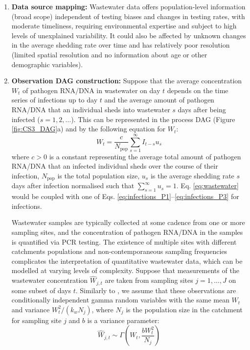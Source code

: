 \documentclass{article}
\begin{document}
\begin{enumerate}
\begin{enumerate}
    \item \textbf{Data source mapping:} Wastewater data offers population-level information (broad scope) independent of testing biases and changes in testing rates, with moderate timeliness, requiring environmental expertise and subject to high levels of unexplained variability. It could also be affected by unknown changes in the average shedding rate over time and has relatively poor resolution (limited spatial resolution and no information about age or other demographic variables). 

    
    \item \textbf{Observation DAG construction:} 
    Suppose that the average concentration $W_t$ of pathogen RNA/DNA in wastewater on day $t$ depends on the time series of infections up to day $t$ and the average amount of pathogen RNA/DNA that an individual sheds into wastewater $s$ days after being infected ($s=1,2,\ldots$). This can be represented in the process DAG (Figure \ref{fig:CS3_DAG}a) and by the following equation for $W_t$:
    \begin{equation} \label{eq:wastewater}
        W_t = \frac{c}{N_\mathrm{pop}}\sum_{s=1}^\infty I_{t-s}u_s 
    \end{equation}
    where $c>0$ is a constant representing the average total amount of pathogen RNA/DNA that an infected individual sheds over the course of their infection, $N_\mathrm{pop}$ is the total population size, $u_s$ is the average shedding rate $s$ days after infection normalised such that $\sum_{s=1}^\infty u_s=1$.  Eq. \eqref{eq:wastewater} would be coupled with one of Eqs. \eqref{eq:infections_P1}--\eqref{eq:infections_P3} for infections.
    
   Wastewater samples are typically collected at some cadence from one or more sampling sites, and the concentration of pathogen RNA/DNA in the samples is quantified via PCR testing. The existence of multiple sites with different catchments populations and non-contemporaneous sampling frequencies complicates the interpretation of quantitative wastewater data, which can be modelled at varying levels of complexity.   
   Suppose that measurements of the wastewater concentration $\hat{W}_{j,t}$ are taken from sampling sites $j=1,\ldots, J$ on some subset of days $t$. Similarly to \cite{watson2024jointly}, we assume that these observations are conditionally independent gamma random variables with the same mean $W_t$ and variance $W_t^2/(k_w N_j)$, where $N_j$ is the population size in the catchment for sampling site $j$ and $b$ is a variance parameter:
    \begin{equation}
        \hat{W}_{j,t} \sim \Gamma\left( W_t,  \frac{b W_t^2}{N_j} \right)
    \end{equation}


\end{enumerate}
\end{enumerate}
\end{document}
